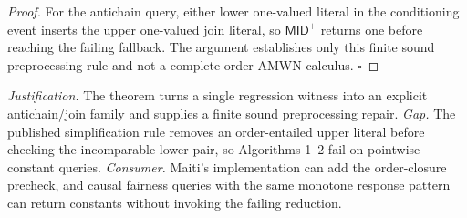 \documentclass{article}
\begin{document}
\begin{proof}
For the antichain query, either lower one-valued literal in the conditioning event inserts the upper one-valued join literal, so \(\mathsf{MID}^{+}\) returns one before reaching the failing fallback.  The argument establishes only this finite sound preprocessing rule and not a complete order-AMWN calculus. \(\square\)
\end{proof}
\par\smallskip\noindent \textit{Justification.} The theorem turns a single regression witness into an explicit antichain/join family and supplies a finite sound preprocessing repair. \textit{Gap.} The published simplification rule removes an order-entailed upper literal before checking the incomparable lower pair, so Algorithms 1--2 fail on pointwise constant queries. \textit{Consumer.} Maiti's implementation can add the order-closure precheck, and causal fairness queries with the same monotone response pattern can return constants without invoking the failing reduction.
\end{document}
